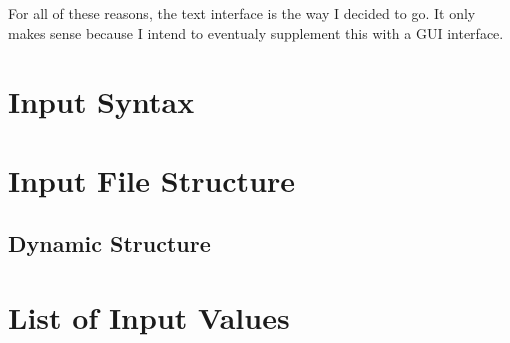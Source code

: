 For all of these reasons, the text interface is the way I decided to go. It only makes sense because I intend to eventualy supplement this with a G\-U\-I interface. \hypertarget{InputSyntax}{}\section{Input Syntax}\label{InputSyntax}
\section*{Input File Structure}

\subsection*{Dynamic Structure}\hypertarget{InputValues}{}\section{List of Input Values}\label{InputValues}
